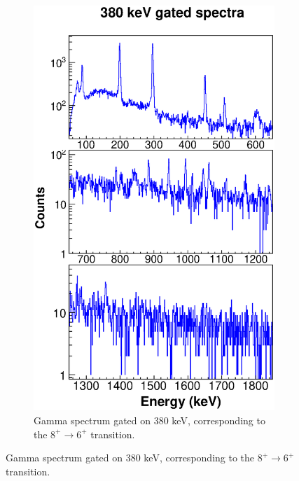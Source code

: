     \begin{figure}
    \ContinuedFloat
    \begin{subfigure}{\textwidth}
    \includegraphics[scale=0.8]{156GdTablesAndFigs/380_gamma.eps}
    \caption{Gamma spectrum gated on 380 keV, corresponding to the $8^+\rightarrow6^+$ transition.}
    \label{fig:156_8to6spec}
    \end{subfigure}
\end{figure}